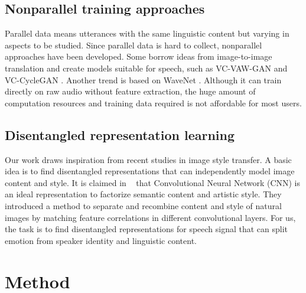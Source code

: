 \documentclass{article}
\begin{document}
\subsection{Nonparallel training approaches}
Parallel data means utterances with the same linguistic content but varying in aspects to be studied. Since parallel data is hard to collect, nonparallel approaches have been developed. Some borrow ideas from image-to-image translation and create models suitable for speech, such as VC-VAW-GAN \cite{hsu2017voice} and VC-CycleGAN \cite{fang2018high}. Another trend is based on WaveNet \cite{van2016wavenet}. Although it can train directly on raw audio without feature extraction, the huge amount of computation resources and training data required is not affordable for most users.


\subsection{Disentangled representation learning}
Our work draws inspiration from recent studies in image style transfer. A basic idea is to find disentangled representations that can independently model image content and style. It is claimed in ~\cite{gatys2016image} that Convolutional Neural Network (CNN) is an ideal representation to factorize semantic content and artistic style. They introduced a method to separate and recombine content and style of natural images by matching feature correlations in different convolutional layers. For us, the task is to find disentangled representations for speech signal that can split emotion from speaker identity and linguistic content.



\section{Method}
\label{sec:method}
\end{document}
